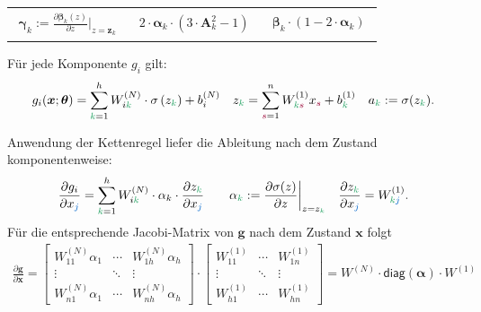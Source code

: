 \documentclass[a4paper, 12pt]{scrartcl}
\newcommand{\gruen}[2][cadGreen]{\textcolor{#1}{#2}}
\newcommand{\blau}[2][blau]{\textcolor{#1}{#2}}
\newcommand{\dunkelrot}[2][dunkelrot]{\textcolor{#1}{#2}}
\begin{document}
\begin{center}
\begin{tabular}{ l l l}
        $\begin{aligned}
            \bm{\gamma}_k :=\frac{\partial \bm{\beta}_k (z)}{\partial z} \bigg|_{z = \bm{z}_k}
        \end{aligned}$
        &
        $\begin{aligned}
            2 \cdot  \bm{\alpha}_k \cdot \left( 3 \cdot \bm{A}_k^2 -1 \right)
        \end{aligned}$
        &
        $\begin{aligned}
            \bm{\beta}_k \cdot \left(1 - 2 \cdot  \bm{\alpha}_k \right) 
        \end{aligned}$ 
    \end{tabular}
\end{center}
%
Für jede Komponente $g_i$ gilt:
%
\begin{align*}
    g_i(\bm{x};\bm{\theta})
    =
    \sum_{\gruen{k} =1}^{h}
    W^{(N)}_{i \gruen{k}} \cdot
    \sigma
    \left(
        z_{\gruen{k}}
    \right)
    + b^{(N)}_i 
    \quad
    z_{\gruen{k}}
    =
    \sum_{\dunkelrot{s}=1}^{n} 
    W^{(1)}_{\gruen{k} \dunkelrot{s}} x_{\dunkelrot{s}} 
    + 
    b^{(1)}_{\gruen{k}} 
    \quad
    a_{\gruen{k}} := \sigma(z_{\gruen{k}}).
\end{align*}

Anwendung der Kettenregel liefer die Ableitung nach dem Zustand komponentenweise:
%
\begin{align}\label{NN:derivative_x}
    \frac{\partial g_i}{\partial x_{\blau{j}}}
    =
    \sum_{\gruen{k} =1}^{h}
    W^{(N)}_{i \gruen{k}} \cdot
    \alpha_k
    \cdot 
    \frac{\partial z_{\gruen{k}}}{\partial x_{\blau{j}}}
    \qquad
    \alpha_{\gruen{k}} := \frac{\partial \sigma(z)}{\partial z} \bigg|_{z = z_{\gruen{k}}}
    \quad
    \frac{\partial z_{\gruen{k}}}{\partial x_{\blau{j}}} 
    =
    W^{(1)}_{\gruen{k}{\blau{j}}}.
\end{align}
%
Für die entsprechende Jacobi-Matrix von $\bm{g}$ nach dem Zustand $\bm{x}$ folgt
%
\begin{align}\label{NN:jacobi_x}
    \frac{\partial \bm{g}}{\partial \bm{x}} 
    =
    \begin{bmatrix}
        W^{(N)}_{11} \alpha_1  & \cdots & W^{(N)}_{1h} \alpha_h \\
        \vdots                 & \ddots & \vdots \\
        W^{(N)}_{n1} \alpha_1  & \cdots & W^{(N)}_{nh} \alpha_h
    \end{bmatrix}
    \cdot 
    \begin{bmatrix}
        W^{(1)}_{11} & \cdots & W^{(1)}_{1n} \\
        \vdots       & \ddots & \vdots \\
        W^{(1)}_{h1} & \cdots & W^{(1)}_{hn}
    \end{bmatrix}
    =
    W^{(N)} \cdot \mathsf{diag}\left(\bm{\alpha}\right) \cdot W^{(1)}
\end{align}
\end{document}
